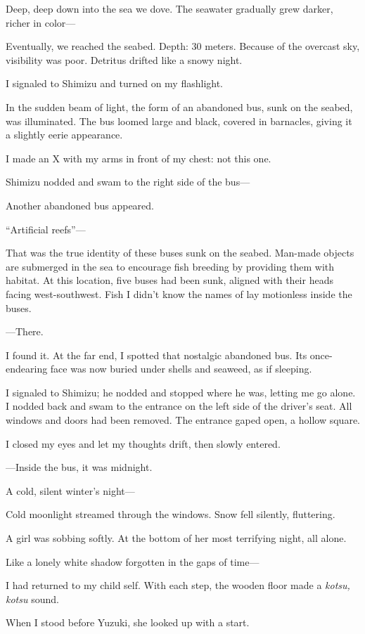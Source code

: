 \documentclass[
    a4paper,
    12pt,
    twoside,
    openany,
    UTF8,
    fontset=windows
]{ctexbook}
\begin{document}
Deep, deep down into the sea we dove. The seawater gradually grew darker, richer in color---

Eventually, we reached the seabed. Depth: 30 meters. Because of the overcast sky, visibility was poor. Detritus drifted like a snowy night.

I signaled to Shimizu and turned on my flashlight.

In the sudden beam of light, the form of an abandoned bus, sunk on the seabed, was illuminated. The bus loomed large and black, covered in barnacles, giving it a slightly eerie appearance.

I made an X with my arms in front of my chest: not this one.

Shimizu nodded and swam to the right side of the bus---

Another abandoned bus appeared.

``Artificial reefs''---

That was the true identity of these buses sunk on the seabed. Man-made objects are submerged in the sea to encourage fish breeding by providing them with habitat. At this location, five buses had been sunk, aligned with their heads facing west-southwest. Fish I didn't know the names of lay motionless inside the buses.

---There.

I found it. At the far end, I spotted that nostalgic abandoned bus. Its once-endearing face was now buried under shells and seaweed, as if sleeping.

I signaled to Shimizu; he nodded and stopped where he was, letting me go alone. I nodded back and swam to the entrance on the left side of the driver's seat. All windows and doors had been removed. The entrance gaped open, a hollow square.

I closed my eyes and let my thoughts drift, then slowly entered.

---Inside the bus, it was midnight.

A cold, silent winter's night---

Cold moonlight streamed through the windows. Snow fell silently, fluttering.

A girl was sobbing softly. At the bottom of her most terrifying night, all alone.

Like a lonely white shadow forgotten in the gaps of time---

I had returned to my child self. With each step, the wooden floor made a \textit{kotsu, kotsu} sound.

When I stood before Yuzuki, she looked up with a start.
\end{document}
